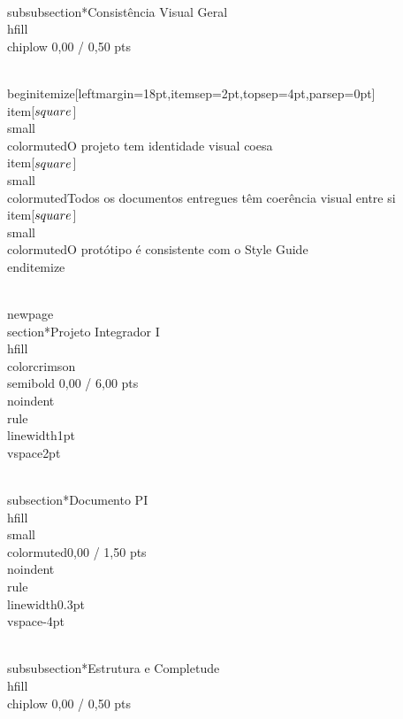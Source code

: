 \documentclass[11pt, a4paper]{article}
\newcommand{\chiplow}[1]{\colorbox{crimsondim}{\color{crimson}\semibold\small\strut\ #1\ }}
\begin{document}
\\subsubsection*{Consistência Visual Geral \\hfill {\\chiplow 0,00 / 0,50 pts}}

\\begin{itemize}[leftmargin=18pt,itemsep=2pt,topsep=4pt,parsep=0pt]
  \\item[$\\square$] {\\small\\color{muted}O projeto tem identidade visual coesa}
  \\item[$\\square$] {\\small\\color{muted}Todos os documentos entregues têm coerência visual entre si}
  \\item[$\\square$] {\\small\\color{muted}O protótipo é consistente com o Style Guide}
\\end{itemize}

\\newpage
\\section*{Projeto Integrador I \\hfill {\\color{crimson}\\semibold 0,00 / 6,00 pts}}
\\noindent\\rule{\\linewidth}{1pt}\\vspace{2pt}

\\subsection*{Documento PI \\hfill {\\small\\color{muted}0,00 / 1,50 pts}}
\\noindent\\rule{\\linewidth}{0.3pt}\\vspace{-4pt}

\\subsubsection*{Estrutura e Completude \\hfill {\\chiplow 0,00 / 0,50 pts}}
\end{document}
